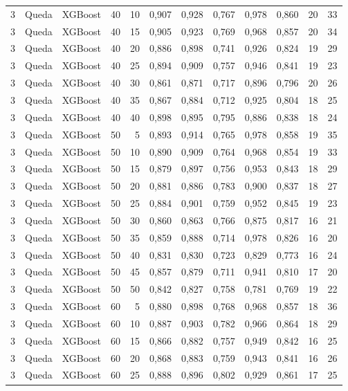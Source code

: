 \begin{longtable}{@{}rllrrrrrrrrr@{}}
3 & Queda & XGBoost & 40 & 10 & 0,907 & 0,928 & 0,767 & 0,978 & 0,860 & 20 & 33 \\
3 & Queda & XGBoost & 40 & 15 & 0,905 & 0,923 & 0,769 & 0,968 & 0,857 & 20 & 34 \\
3 & Queda & XGBoost & 40 & 20 & 0,886 & 0,898 & 0,741 & 0,926 & 0,824 & 19 & 29 \\
3 & Queda & XGBoost & 40 & 25 & 0,894 & 0,909 & 0,757 & 0,946 & 0,841 & 19 & 23 \\
3 & Queda & XGBoost & 40 & 30 & 0,861 & 0,871 & 0,717 & 0,896 & 0,796 & 20 & 26 \\
3 & Queda & XGBoost & 40 & 35 & 0,867 & 0,884 & 0,712 & 0,925 & 0,804 & 18 & 25 \\
3 & Queda & XGBoost & 40 & 40 & 0,898 & 0,895 & 0,795 & 0,886 & 0,838 & 18 & 24 \\
3 & Queda & XGBoost & 50 & 5 & 0,893 & 0,914 & 0,765 & 0,978 & 0,858 & 19 & 35 \\
3 & Queda & XGBoost & 50 & 10 & 0,890 & 0,909 & 0,764 & 0,968 & 0,854 & 19 & 33 \\
3 & Queda & XGBoost & 50 & 15 & 0,879 & 0,897 & 0,756 & 0,953 & 0,843 & 18 & 29 \\
3 & Queda & XGBoost & 50 & 20 & 0,881 & 0,886 & 0,783 & 0,900 & 0,837 & 18 & 27 \\
3 & Queda & XGBoost & 50 & 25 & 0,884 & 0,901 & 0,759 & 0,952 & 0,845 & 19 & 23 \\
3 & Queda & XGBoost & 50 & 30 & 0,860 & 0,863 & 0,766 & 0,875 & 0,817 & 16 & 21 \\
3 & Queda & XGBoost & 50 & 35 & 0,859 & 0,888 & 0,714 & 0,978 & 0,826 & 16 & 20 \\
3 & Queda & XGBoost & 50 & 40 & 0,831 & 0,830 & 0,723 & 0,829 & 0,773 & 16 & 24 \\
3 & Queda & XGBoost & 50 & 45 & 0,857 & 0,879 & 0,711 & 0,941 & 0,810 & 17 & 20 \\
3 & Queda & XGBoost & 50 & 50 & 0,842 & 0,827 & 0,758 & 0,781 & 0,769 & 19 & 22 \\
3 & Queda & XGBoost & 60 & 5 & 0,880 & 0,898 & 0,768 & 0,968 & 0,857 & 18 & 36 \\
3 & Queda & XGBoost & 60 & 10 & 0,887 & 0,903 & 0,782 & 0,966 & 0,864 & 18 & 29 \\
3 & Queda & XGBoost & 60 & 15 & 0,866 & 0,882 & 0,757 & 0,949 & 0,842 & 16 & 25 \\
3 & Queda & XGBoost & 60 & 20 & 0,868 & 0,883 & 0,759 & 0,943 & 0,841 & 16 & 26 \\
3 & Queda & XGBoost & 60 & 25 & 0,888 & 0,896 & 0,802 & 0,929 & 0,861 & 17 & 25 \\

\end{longtable}
